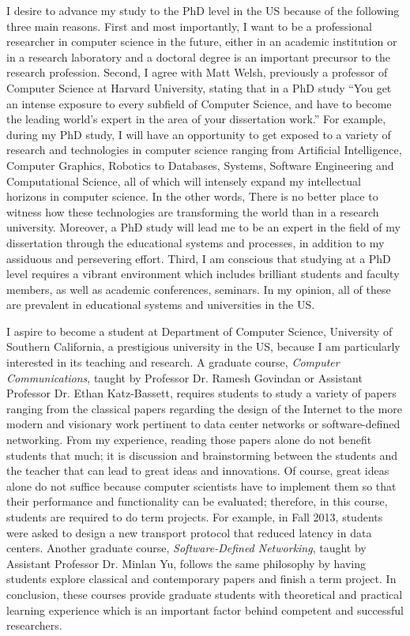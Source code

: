 \documentclass[a4paper,12pt]{report}
\newcommand{\university}{University of Southern California}
\newcommand{\department}{Department of Computer Science}
\begin{document}
\vspace{0.2cm}
I desire to advance my study to the PhD level in the US because of the following three main reasons. First and most importantly, I want to be a professional researcher in computer science in the future, either in an academic institution or in a research laboratory and a doctoral degree is an important precursor to the research profession. Second, I agree with Matt Welsh, previously a professor of Computer Science at Harvard University, stating that in a PhD study ``You get an intense exposure to every subfield of Computer Science, and have to become the leading world's expert in the area of your dissertation work.'' For example, during my PhD study, I will have an opportunity to get exposed to a variety of research and technologies in computer science ranging from Artificial Intelligence, Computer Graphics, Robotics to Databases, Systems, Software Engineering and Computational Science, all of which will intensely expand my intellectual horizons in computer science. In the other words, There is no better place to witness how these technologies are transforming the world than in a research university. Moreover, a PhD study will lead me to be an expert in the field of my dissertation through the educational systems and processes, in addition to my assiduous and persevering effort. Third, I am conscious that studying at a PhD level requires a vibrant environment which includes brilliant students and faculty members, as well as academic conferences, seminars. In my opinion, all of these are prevalent in educational systems and universities in the US.

\vspace{0.2cm}
I aspire to become a student at \department, \university, a prestigious university in the US, because I am particularly interested in its teaching and research. A graduate course, \textit{Computer Communications}, taught by Professor Dr. Ramesh Govindan or Assistant Professor Dr. Ethan Katz-Bassett, requires students to study a variety of papers ranging from the classical papers regarding the design of the Internet to the more modern and visionary work pertinent to data center networks or software-defined networking. From my experience, reading those papers alone do not benefit students that much; it is discussion and brainstorming between the students and the teacher that can lead to great ideas and innovations. Of course, great ideas alone do not suffice because computer scientists have to implement them so that their performance and functionality can be evaluated; therefore, in this course, students are required to do term projects. For example, in Fall 2013, students were asked to design a new transport protocol that reduced latency in data centers. Another graduate course, \textit{Software-Defined Networking}, taught by Assistant Professor Dr. Minlan Yu, follows the same philosophy by having students explore classical and contemporary papers and finish a term project. In conclusion, these courses provide graduate students with theoretical and practical learning experience which is an important factor behind competent and successful researchers.
\end{document}
